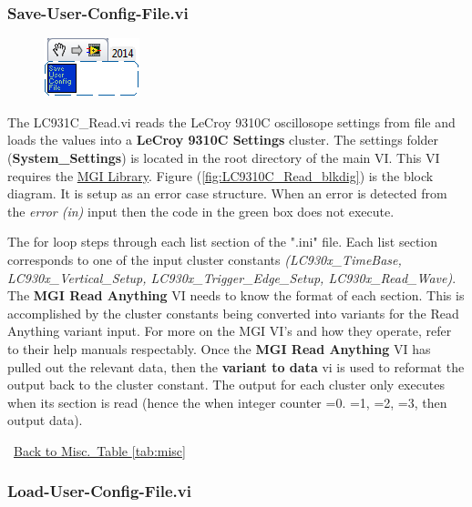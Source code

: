 \documentclass[11pt,a4paper,oldfontcommands]{memoir}
\begin{document}
\subsubsection{Save-User-Config-File.vi} \label{Save-User-Config-File}
\noindent\hrulefill

\begin{figure}[h]
	\includegraphics[scale=0.625]{Save-User-Config-File_main_01}
	\label{fig:Save-User-Config-File_main_01}
\end{figure}

The LC931C\_Read.vi reads the LeCroy 9310C oscillosope settings from file and loads the values into a \textbf{LeCroy 9310C Settings} cluster. The settings folder (\textbf{System\_Settings}) is located in the root directory of the main VI. This VI requires the \href{http://sine.ni.com/nips/cds/view/p/lang/en/nid/209753}{MGI Library}. Figure (\ref{fig:LC9310C_Read_blkdig}) is the block diagram.  It is setup as an error case structure. When an error is detected from the \textit{error (in)} input then the code in the green box does not execute.

The for loop steps through each list section of the ".ini" file. Each list section corresponds to one of the input cluster constants \textit{(LC930x\_TimeBase, LC930x\_Vertical\_Setup, LC930x\_Trigger\_Edge\_Setup, LC930x\_Read\_Wave)}. The \textbf{MGI Read Anything} VI needs to know the format of each section. This is accomplished by the cluster constants being converted into variants for the Read Anything variant input.  For more on the MGI VI's and how they operate, refer to their help manuals respectably. Once the \textbf{MGI Read Anything} VI has pulled out the relevant data, then the \textbf{variant to data} vi is used to reformat the output back to the cluster constant. The output for each cluster only executes when its section is read (hence the when integer counter =0. =1, =2, =3, then output data).

\noindent\hrulefill\, \hyperref[tab:misc]{Back to Misc.\ Table \ref{tab:misc}}

\subsubsection{Load-User-Config-File.vi} \label{Load-User-Config-File}
\noindent\hrulefill
\end{document}
